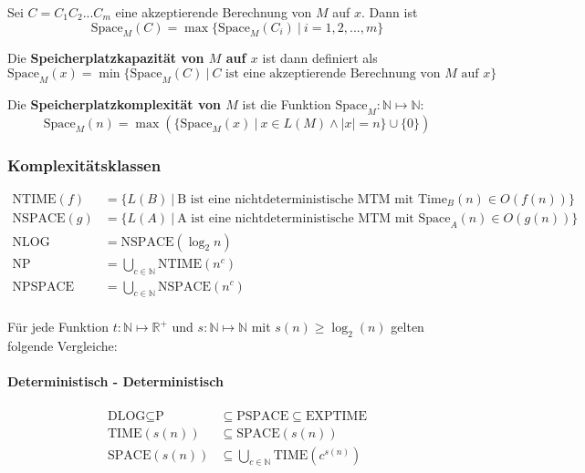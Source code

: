 \documentclass[11pt]{article}
\newcommand{\ttc}{\text{Time}}
\newcommand{\tsc}{\text{Space}}
\begin{document}
Sei $C = C_1C_2...C_m$ eine akzeptierende Berechnung von $M$ auf $x$. Dann ist
\begin{equation*}
	\tsc_M(C) = \max\{\tsc_M(C_i)\ |\ i=1,2,...,m\}
\end{equation*}

Die \textbf{Speicherplatzkapazit{\"a}t von $M$ auf $x$} ist dann definiert als
\begin{equation*}
	\tsc_M(x) = \min\{\tsc_M(C)\ |\ \text{$C$ ist eine akzeptierende Berechnung von $M$ auf $x$}\}
\end{equation*}

Die \textbf{Speicherplatzkomplexit{\"a}t von $M$} ist die Funktion $\tsc_M: \mathbb{N} \mapsto \mathbb{N}$:
\begin{equation*}
	\tsc_M(n) = \max(\{ \tsc_M(x)\ |\ x \in L(M) \land |x| = n\} \cup \{0\})
\end{equation*}

\subsubsection{Komplexit{\"a}tsklassen}

\begin{equation*}
\begin{split}
	\text{NTIME}(f) & = \{L(B)\ |\ \text{B ist eine nichtdeterministische MTM mit } \ttc_B(n) \in O(f(n))\} \\
	\text{NSPACE}(g) & = \{L(A)\ |\ \text{A ist eine nichtdeterministische MTM mit } \tsc_A(n) \in O(g(n))\} \\
	\text{NLOG} & = \text{NSPACE}(\log_2 n) \\
	\text{NP} & = \bigcup_{c \in \mathbb{N}} \text{NTIME}(n^c) \\
	\text{NPSPACE} & = \bigcup_{c \in \mathbb{N}} \text{NSPACE}(n^c) \\
\end{split}
\end{equation*}

F{\"u}r jede Funktion $t: \mathbb{N} \mapsto \mathbb{R}^+$ und $s: \mathbb{N} \mapsto \mathbb{N}$ mit $s(n) \geq \log_2(n)$ gelten folgende Vergleiche:

\paragraph{Deterministisch - Deterministisch}
\begin{equation*}
\begin{split}
	\text{DLOG} \subseteq \text{P} & \subseteq \text{PSPACE} \subseteq \text{EXPTIME} \\
	\text{TIME}(s(n)) & \subseteq \text{SPACE}(s(n)) \\
	\text{SPACE}(s(n)) & \subseteq \bigcup_{c \in \mathbb{N}} \text{TIME}(c^{s(n)})\\
\end{split}
\end{equation*}
\end{document}
